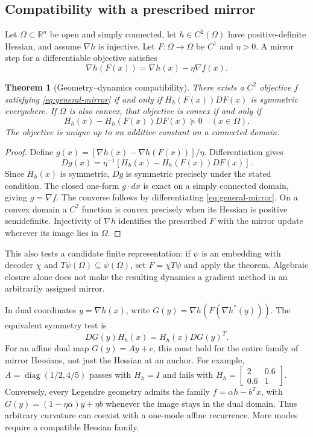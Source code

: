 \documentclass[journal]{IEEEtran}
\newtheorem{theorem}{Theorem}
\theoremstyle{definition}
\newcommand{\R}{\mathbb{R}}
\DeclareMathOperator{\diag}{diag}
\begin{document}
\subsection{Compatibility with a prescribed mirror}
Let $\Omega\subset\R^n$ be open and simply connected, let $h\in C^2(\Omega)$
have positive-definite Hessian, and assume $\nabla h$ is injective. Let
$F:\Omega\to\Omega$ be $C^1$ and $\eta>0$. A mirror step for a differentiable
objective satisfies
\begin{equation}
 \nabla h(F(x))=\nabla h(x)-\eta\nabla f(x).
 \label{eq:general-mirror}
\end{equation}
\begin{theorem}[Geometry--dynamics compatibility]
There exists a $C^2$ objective $f$ satisfying \eqref{eq:general-mirror} if and
only if $H_h(F(x))DF(x)$ is symmetric everywhere. If $\Omega$ is also convex,
that objective is convex if and only if
\begin{equation}
 H_h(x)-H_h(F(x))DF(x)\succeq0 \quad(x\in\Omega).
 \label{eq:general-convexity}
\end{equation}
The objective is unique up to an additive constant on a connected domain.
\end{theorem}
\begin{proof}
Define $g(x)=[\nabla h(x)-\nabla h(F(x))]/\eta$. Differentiation gives
\[ Dg(x)=\eta^{-1}[H_h(x)-H_h(F(x))DF(x)]. \]
Since $H_h(x)$ is symmetric,
$Dg$ is symmetric precisely under the stated condition. The closed one-form
$g\cdot dx$ is exact on a simply connected domain, giving $g=\nabla f$.
The converse follows by differentiating \eqref{eq:general-mirror}.
On a convex domain a $C^2$ function is convex precisely when its Hessian is
positive semidefinite. Injectivity of $\nabla h$ identifies the prescribed
$F$ with the mirror update wherever its image lies in $\Omega$.
\end{proof}
This also tests a candidate finite representation: if $\psi$ is an embedding
with decoder $\chi$ and $T\psi(\Omega)\subseteq\psi(\Omega)$, set
$F=\chi T\psi$ and apply the theorem. Algebraic closure alone does not make
the resulting dynamics a gradient method in an arbitrarily assigned mirror.

In dual coordinates $y=\nabla h(x)$, write
$G(y)=\nabla h(F(\nabla h^*(y)))$. The equivalent symmetry test is
\begin{equation}
 DG(y)H_h(x)=H_h(x)DG(y)^T.
 \label{eq:dual-compatibility}
\end{equation}
For an affine dual map $G(y)=Ay+c$, this must hold for the entire family
of mirror Hessians, not just the Hessian at an anchor. For example,
$A=\diag(1/2,4/5)$ passes with $H_h=I$ and fails with
$H_h=\left[\begin{smallmatrix}2&0.6\\0.6&1\end{smallmatrix}\right]$.
Conversely, every Legendre geometry admits the family
$f=\alpha h-b^Tx$, with $G(y)=(1-\eta\alpha)y+\eta b$ whenever the image
stays in the dual domain. Thus arbitrary curvature can coexist with a
one-mode affine recurrence. More modes require a compatible Hessian family.
\end{document}
